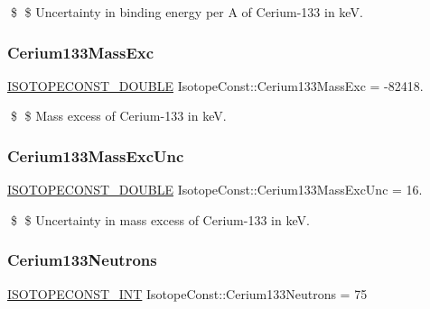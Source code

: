 \$ \$ Uncertainty in binding energy per A of Cerium-\/133 in keV. \mbox{\label{group___isotope_const-_cerium-_ce133_gae8c05ad3cbd7e49a50dd89663f0ab944}} 
\subsubsection{\texorpdfstring{Cerium133\+Mass\+Exc}{Cerium133MassExc}}
{\footnotesize\ttfamily \mbox{\hyperlink{group___isotope_const-_macros_ga8f45a7272ce02c0b4c65c44636ed719a}{I\+S\+O\+T\+O\+P\+E\+C\+O\+N\+S\+T\+\_\+\+D\+O\+U\+B\+LE}} Isotope\+Const\+::\+Cerium133\+Mass\+Exc = -\/82418.}

\$ \$ Mass excess of Cerium-\/133 in keV. \mbox{\label{group___isotope_const-_cerium-_ce133_gaaf6c63dade458dfa8c8c46c078a31a65}} 
\subsubsection{\texorpdfstring{Cerium133\+Mass\+Exc\+Unc}{Cerium133MassExcUnc}}
{\footnotesize\ttfamily \mbox{\hyperlink{group___isotope_const-_macros_ga8f45a7272ce02c0b4c65c44636ed719a}{I\+S\+O\+T\+O\+P\+E\+C\+O\+N\+S\+T\+\_\+\+D\+O\+U\+B\+LE}} Isotope\+Const\+::\+Cerium133\+Mass\+Exc\+Unc = 16.}

\$ \$ Uncertainty in mass excess of Cerium-\/133 in keV. \mbox{\label{group___isotope_const-_cerium-_ce133_ga1921bc0a02567f678edab20d5b920046}} 
\subsubsection{\texorpdfstring{Cerium133\+Neutrons}{Cerium133Neutrons}}
{\footnotesize\ttfamily \mbox{\hyperlink{group___isotope_const-_macros_ga5f18360b3e99483a35c32d789e62621c}{I\+S\+O\+T\+O\+P\+E\+C\+O\+N\+S\+T\+\_\+\+I\+NT}} Isotope\+Const\+::\+Cerium133\+Neutrons = 75}

